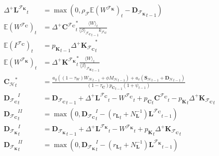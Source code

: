 \documentclass[a4paper, headings=standardclasses]{scrartcl}
\numberwithin{equation}{subsection}
\begin{document}
{\begin{align}
		{\Delta^+{\mathbf{L}^{\mathcal{F}_\mathbf{K}}}}_t & = \max\left(0,\rho_\mathcal{F} \mathbb{E}(W^{\mathcal{F}_\mathbf{K}})_t - {\mathbf{D}_{\mathcal{F}_\mathbf{K}}}_{t-1}\right) \\
		\mathbb{E}(W^{\mathcal{F}_\mathbf{C}})_t & = {\Delta^+ {\mathbf{C}^{\mathcal{F}_\mathbf{C}}}}^*_t\frac{\langle W \rangle_t}{{\langle\beta\rangle_{\mathcal{F}_\mathbf{C}}}_{t-1} k_{\mathcal{F}_\mathbf{C}}} \\
		\mathbb{E}(I^{\mathcal{F}_\mathbf{C}})_t & = {p_\mathbf{K}}_{t-1} {\Delta^+ \mathbf{K}_{\mathcal{F}_\mathbf{C}}}^*_t\\
		\mathbb{E}(W^{\mathcal{F}_\mathbf{K}})_t & = {\Delta^+ {\mathbf{K}^{\mathcal{F}_\mathbf{K}}}}^*_t\frac{\langle W \rangle_t}{{\langle\beta\rangle_{\mathcal{F}_\mathbf{K}}}_{t-1}} \\
		{\mathbf{C}_\mathcal{H}}_t^* & = \frac{a_y ((1-\tau_W){W_\mathcal{H}}_{t-1} + \phi {M_\mathcal{H}}_{t-1}) + a_v ({\mathbf{S}_\mathcal{H}}_{t-1} + {\mathbf{D}_\mathcal{H}}_{t-1})}{{(1-\tau_\mathbf{C}) p_\mathbf{C}}_{t-1} (1+\psi_{t-1})} \\
		{\mathbf{D}_{\mathcal{F}_\mathbf{C}}}^{I}_t           & = {\mathbf{D}_{\mathcal{F}_\mathbf{C}}}_{t-1} + {\Delta^+{\mathbf{L}^{\mathcal{F}_\mathbf{C}}}}_t - {W^{\mathcal{F}_\mathbf{C}}}_t + {p_{\mathbf{C}}}_t {\mathbf{C}^{\mathcal{F}_\mathbf{C}}}_t - {p_{\mathbf{K}}}_t {\Delta^+{\mathbf{K}_{\mathcal{F}_\mathbf{C}}}}_t \\
		{\mathbf{D}_{\mathcal{F}_\mathbf{C}}}^{II}_t           & = \max(0, {\mathbf{D}_{\mathcal{F}_\mathbf{C}}}^{I}_t - ({r_\mathbf{L}}                                                                                                                                                                                                                                                                       _t + N_\mathbf{L}^{-1}) {\mathbf{L}^{\mathcal{F}_\mathbf{C}}}_{t-1}) \\
		{\mathbf{D}_{\mathcal{F}_\mathbf{K}}}^{I}_t           & = {\mathbf{D}_{\mathcal{F}_\mathbf{K}}}_{t-1} + {\Delta^+{\mathbf{L}^{\mathcal{F}_\mathbf{K}}}}_t - {W^{\mathcal{F}_\mathbf{K}}}_t +  {p_{\mathbf{K}}}_t {\Delta^+{\mathbf{K}_{\mathcal{F}_\mathbf{C}}}}_t \\
		{\mathbf{D}_{\mathcal{F}_\mathbf{K}}}^{II}_t           & = \max(0, {\mathbf{D}_{\mathcal{F}_\mathbf{K}}}^{I}_t - ({r_\mathbf{L}}                                                                                                                                                                                                                                                                       _t + N_\mathbf{L}^{-1}) {\mathbf{L}^{\mathcal{F}_\mathbf{K}}}_{t-1}) \\

\end{align}}
\end{document}

